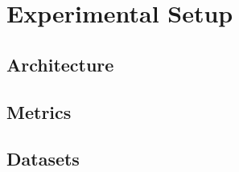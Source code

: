 \chapter{Experimental Setup}\label{ch:experimental-setup}

\section{Architecture}

\section{Metrics}

\section{Datasets}
